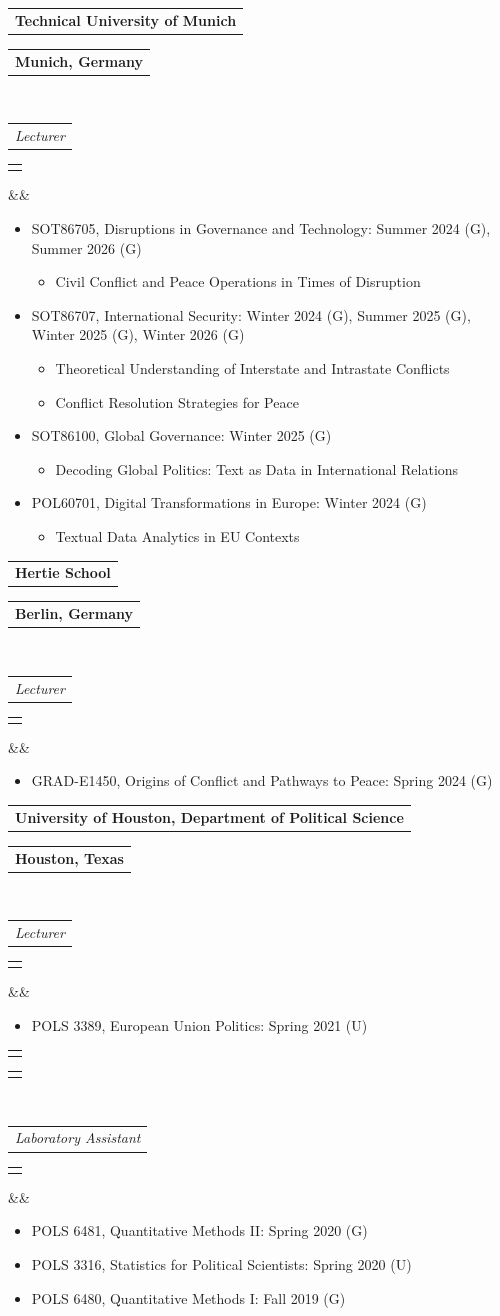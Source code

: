 \documentclass[11pt,a4paper,roman]{moderncv}
\makeatletter
\newcommand*{\customcventry}[7][.25em]{%
	\begin{tabular}{@{}l}{\bfseries #4}\end{tabular}%
	\hfill%
	\begin{tabular}{l@{}}{\bfseries #5}\end{tabular}\\
	\begin{tabular}{@{}l}{\itshape #3}\end{tabular}%
	\hfill%
	\begin{tabular}{l@{}}{\itshape #2}\end{tabular}%
	\ifx&#7&%
	\else{\\%
		\begin{minipage}{\maincolumnwidth}\small#7\end{minipage}}\fi%
	\par\addvspace{#1}}
\makeatother
\begin{document}
	\customcventry{}{Lecturer}{Technical University of Munich}{Munich, Germany}{}{}
	\begin{itemize}
		\item SOT86705, Disruptions in Governance and Technology: Summer 2024 (G), Summer 2026 (G)
		\begin{itemize}
			\item Civil Conflict and Peace Operations in Times of Disruption
		\end{itemize}
		\item SOT86707, International Security: Winter 2024 (G), Summer 2025 (G), Winter 2025 (G), Winter 2026 (G)
		\begin{itemize}
			\item Theoretical Understanding of Interstate and Intrastate Conflicts
			\item Conflict Resolution Strategies for Peace
		\end{itemize}
		\item SOT86100, Global Governance: Winter 2025 (G)
		\begin{itemize}
			\item Decoding Global Politics: Text as Data in International Relations
		\end{itemize}
		\item POL60701, Digital Transformations in Europe: Winter 2024 (G)
		\begin{itemize}
			\item Textual Data Analytics in EU Contexts
		\end{itemize}
	\end{itemize}
	\vspace*{3mm}
	
	\customcventry{}{Lecturer}{Hertie School}{Berlin, Germany}{}{}
	\begin{itemize}
		\item GRAD-E1450, Origins of Conflict and Pathways to Peace: Spring 2024 (G)
	\end{itemize}
	\vspace*{3mm}
	
\customcventry{}{Lecturer}{University of Houston, Department of Political Science}{Houston, Texas}{}{}
	\begin{itemize}
		\item POLS 3389, European Union Politics: Spring 2021 (U)
	\end{itemize}
	\vspace*{1mm}
	
	\customcventry{}{Laboratory Assistant}{}{}{}{}
	\begin{itemize}
		\item POLS 6481, Quantitative Methods II: Spring 2020 (G)
		\item POLS 3316, Statistics for Political Scientists: Spring 2020 (U)
		\item POLS 6480, Quantitative Methods I: Fall 2019 (G)
	\end{itemize}
	\vspace*{1mm}
	
\end{document}

